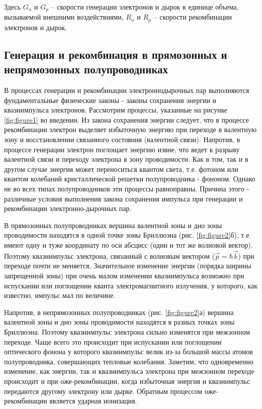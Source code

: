 Здесь $G_n$ и $G_p$ -- скорости генерации электронов и дырок в единице объема, вызываемой внешними воздействиями, $R_n$ и $R_p$ -- скорости рекомбинации электронов и дырок.

\subsection{Генерация и рекомбинация в прямозонных и непрямозонных полупроводниках}

В процессах генерации и рекомбинации электроннодырочных пар выполняются фундаментальные физические законы - законы сохранения энергии и квазиимпульса электронов. Рассмотрим процессы, указанные на рисунке \ref{fig:figure1} во введении. Из закона сохранения энергии следует, что в процессе рекомбинации электрон выделяет избыточную энергию при переходе в валентную зону и восстановлении связанного состояния (валентной связи). Напротив, в процессе генерации электрон поглощает энергию извне, что ведет к разрыву валентной связи и переходу электрона в зону проводимости. Как в том, так и в другом случае энергия может переноситься квантом света, т.е. фотоном или квантом колебаний кристаллической решетки полупроводника - фононом. Однако не во всех типах полупроводников эти процессы равноправны. Причина этого - различные условия выполнения закона сохранения импульса при генерации и рекомбинации электронно-дырочных пар.

В прямозонных полупроводниках вершина валентной зоны и дно зоны проводимости находятся в одной точке зоны Бриллюэна (рис.  \ref{fig:figure2}б), т.е. имеют одну и туже координату по оси абсцисс (один и тот же волновой вектор). Поэтому квазиимпульс электрона, связанный с волновым вектором ($\vec{p}=\hbar \vec{k}$) при переходе почти не меняется. Значительное изменение энергии (порядка ширины запрещенной зоны) при очень малом изменении квазиимпульса возможно при испускании или поглощении кванта электромагнитного излучения, у которого, как известно, импульс мал по величине.

Напротив, в непрямозонных полупроводниках (рис.  \ref{fig:figure2}а) вершина валентной зоны и дно зоны проводимости находятся в разных точках зоны Бриллюэна. Поэтому квазиимпульс электрона сильно изменятся при межзонном переходе. Чаще всего это происходит при испускании или поглощении оптического фонона у которого квазиимпульс велик из-за большой массы атомов полупроводника, совершающих тепловые колебания. Заметим, что одновременно изменение, как энергии, так и квазиимпульса электрона при межзонном переходе происходит и при оже-рекомбинации, когда избыточная энергия и квазиимпульс передаются другому электрону или дырке. Обратным процессом оже-рекомбинации является ударная ионизация.

